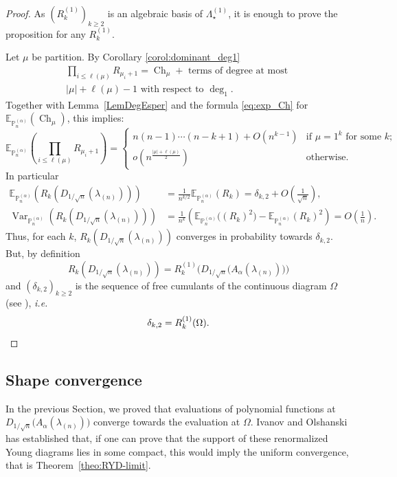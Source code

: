 \documentclass[11pt]{amsart}
\theoremstyle{plain}
\theoremstyle{remark}
\newcommand{\PP}{\mathbb{P}}
\newcommand{\Pol}{\Lambda_\star}
\newcommand{\esper}{\mathbb{E}}
\DeclareMathOperator{\Var}{Var}
\DeclareMathOperator{\Ch}{Ch}
\begin{document}
\begin{proof}
    As $(R^{(1)}_k)_{k \geq 2}$ is an algebraic basis of $\Pol^{(1)}$,
    it is enough to prove the proposition for any $R^{(1)}_k$.

Let $\mu$ be partition.
By Corollary \ref{corol:dominant_deg1}
\begin{multline}\label{EqTopDeg1}
    \prod_{i \leq \ell(\mu)} R_{\mu_i+1} =
    \Ch_\mu + \text{ terms of degree at most }\\
    |\mu|+\ell(\mu)-1\text{ with respect to }\deg_1.
\end{multline}
Together with Lemma~\ref{LemDegEsper} and the formula \eqref{eq:exp_Ch} for $\esper_{\PP_n^{(\alpha)}}(\Ch_\mu)$,
this implies:
\[ \esper_{\PP_n^{(\alpha)}} \left(\prod_{i \leq \ell(\mu)}R_{\mu_i+1}\right) = \begin{cases}
    n(n-1)\cdots(n-k+1) + O(n^{k-1}) & \text{if }\mu=1^k \text{ for some }k; \\
    o(n^{\frac{|\mu|+\ell(\mu)}{2}}) & \text{otherwise.}
\end{cases}\]
In particular
\begin{align*}
    \esper_{\PP_n^{(\alpha)}} (R_k(D_{1/\sqrt{n}}(\lambda_{(n)}))) &=
\frac{1}{n^{k/2}}
    \esper_{\PP_n^{(\alpha)}} (R_k) = \delta_{k,2} + O\left(\frac{1}{\sqrt{n}}\right), \\
    \Var_{\PP_n^{(\alpha)}} (R_k(D_{1/\sqrt{n}}(\lambda_{(n)}))) &= \frac{1}{n^k}
\left( 
    \esper_{\PP_n^{(\alpha)}} \big((R_k)^2\big) - \esper_{\PP_n^{(\alpha)}} (R_k)^2
\right)
    = O\left(\frac{1}{n}\right).
\end{align*}
Thus, for each $k$, $R_k(D_{1/\sqrt{n}}(\lambda_{(n)}))$ converges in probability
towards $\delta_{k,2}$. 
But, by definition 
\[R_k(D_{1/\sqrt{n}}(\lambda_{(n)}))=R^{(1)}_k \bigg(D_{1/\sqrt{n}}\big(A_\alpha(\lambda_{(n)})\big)\bigg)\]
and $(\delta_{k,2})_{k \geq 2}$ is the sequence of free cumulants of the continuous diagram $\Omega$
(see \cite[Section 3.1]{Biane2001}),
\emph{i.e.} 
\[ \delta_{k,2} = R_k^{(1)}(\Omega).\qedhere\]
\end{proof}

\subsection{Shape convergence}
In the previous Section, we proved that evaluations of polynomial functions
at $D_{1/\sqrt{n}} \big(A_\alpha(\lambda_{(n)})\big)$
converge towards the evaluation at $\Omega$.
Ivanov and Olshanski has established that,
if one can prove that the support of
these renormalized Young diagrams lies in some compact,
this would imply the uniform convergence, that is Theorem~\ref{theo:RYD-limit}.
\end{document}
